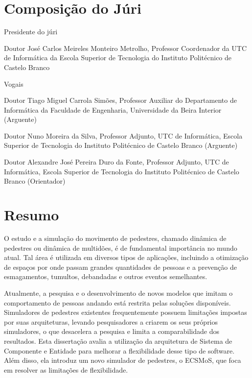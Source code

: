 \documentclass[twoside, 11pt]{article}
\begin{document}
 
\blankpage
\newpage

\section*{Composição do Júri}

\noindent Presidente do júri

Doutor José Carlos Meireles Monteiro Metrolho, Professor Coordenador da UTC de Informática da Escola Superior de Tecnologia do Instituto Politécnico de Castelo Branco

\vspace{0.5cm}

\noindent Vogais

Doutor Tiago Miguel Carrola Simões, Professor Auxiliar do Departamento de Informática da Faculdade de Engenharia, Universidade da Beira Interior (Arguente)

\vspace{1cm}

Doutor Nuno Moreira da Silva, Professor Adjunto, UTC de Informática, Escola Superior de Tecnologia do Instituto Politécnico de Castelo Branco (Arguente)

\vspace{1cm}

Doutor Alexandre José Pereira Duro da Fonte, Professor Adjunto, UTC de Informática, Escola Superior de Tecnologia do Instituto Politécnico de Castelo Branco (Orientador)

\clearpage            %
\null                %
\newpage             %

\section*{Resumo}

O estudo e a simulação do movimento de pedestres, chamado dinâmica de pedestres ou dinâmica de multidões, é de fundamental importância no mundo atual. Tal área é utilizada em diversos tipos de aplicações, incluindo a otimização de espaços por onde passam grandes quantidades de pessoas e a prevenção de esmagamentos, tumultos, debandadas e outros eventos semelhantes.

Atualmente, a pesquisa e o desenvolvimento de novos modelos que imitam o comportamento de pessoas andando está restrita pelas soluções disponíveis. Simuladores de pedestres existentes frequentemente possuem limitações impostas por suas arquiteturas, levando pesquisadores a criarem os seus próprios simuladores, o que desacelera a pesquisa e limita a comparabilidade dos resultados. Esta dissertação avalia a utilização da arquitetura de Sistema de Componente e Entidade para melhorar a flexibilidade desse tipo de software. Além disso, ela introduz um novo simulador de pedestres, o ECSMoS, que foca em resolver as limitações de flexibilidade.
\end{document}
